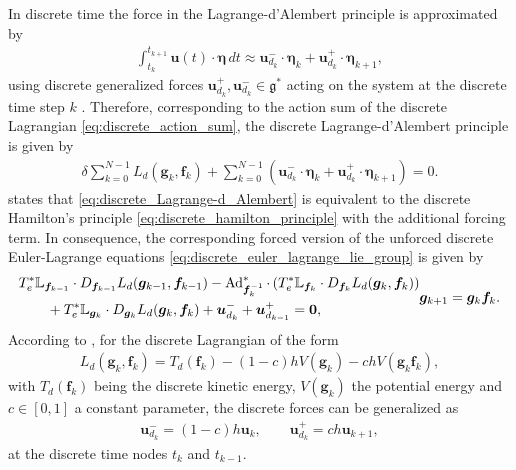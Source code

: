 In discrete time the force in the Lagrange-d'Alembert principle is approximated by 
\begin{align}
    \int_{t_k}^{t_{k+1}} \bm{u}(t) \cdot \bm{\eta}\, dt \approx \bm{u}_{d_k}^- \cdot \bm{\eta}_k + \bm{u}_{d_k}^+ \cdot \bm{\eta}_{k+1},
\end{align}
using discrete generalized forces $\bm{u}_{d_k}^{+}, \bm{u}_{d_k}^{-} \in \mathfrak{g}^*$ acting on the system at the discrete time step $k$ \cite{Lee2008}.
Therefore, corresponding to the action sum of the discrete Lagrangian \eqref{eq:discrete_action_sum}, the discrete Lagrange-d'Alembert principle is given by 
\begin{align}\label{eq:discrete_Lagrange-d_Alembert}
    \delta \sum_{k=0}^{N-1} L_d(\bm{g}_k, \bm{f}_k) + \sum_{k=0}^{N-1} \left( \bm{u}_{d_k}^- \cdot \bm{\eta}_k + \bm{u}_{d_k}^+ \cdot \bm{\eta}_{k+1} \right) = 0.
\end{align}
\cite{Lee2008} states that \eqref{eq:discrete_Lagrange-d_Alembert} is equivalent to the discrete Hamilton's principle \eqref{eq:discrete_hamilton_principle} with the additional forcing term. 
In consequence, 
the corresponding forced version 
of the unforced discrete Euler-Lagrange equations 
\eqref{eq:discrete_euler_lagrange_lie_group} is given by
\begingroup
\small
\begin{subequations}\label{eq:discrete_forced_Euler_Lagrange}
\begin{align}
    \label{eq:discrete_forced_Euler_Lagrange_Dynamics}
    &T^*_{e}\mathbb{L}_{\bm{f}_{k-1}} \cdot D_{\bm{f}_{k-1}} L_d(\bm{g}_{k-1}, \bm{f}_{k-1})
    - \operatorname{Ad}^*_{\bm{f}_{k}^{-1}} \cdot \left(T^*_{e}\mathbb{L}_{\bm{f}_{k}} \cdot D_{\bm{f}_{k}}L_d(\bm{g}_{k}, \bm{f}_{k})\right) \notag \\
    &\qquad + T^*_{e}\mathbb{L}_{\bm{g}_{k}} \cdot D_{\bm{g}_{k}} L_d(\bm{g}_{k}, \bm{f}_{k})
    + \bm{u}^-_{d_k} + \bm{u}^+_{d_{k-1}} = \bm{0},
\end{align}
\vspace{-1.2\baselineskip}
\begin{equation}\label{eq:discrete_forced_Euler_Lagrange_Kinetics}
    \bm{g}_{k+1} = \bm{g}_{k}\bm{f}_{k}.
\end{equation}
\end{subequations}
\endgroup
According to \cite{Lee2008}, for the discrete Lagrangian of the form
\begin{align}\label{eq:discrete_lagrangian_forced_special}
    L_d(\bm{g}_k, \bm{f}_k) = T_d(\bm{f}_k) - (1-c)hV(\bm{g}_k) - chV(\bm{g}_k\bm{f}_k),
\end{align}
with $T_d(\bm{f}_k)$ being the discrete kinetic energy, $V(\bm{g}_k)$ the potential energy and $c \in [0,1]$ a constant parameter, 
the discrete forces can be generalized as
\begin{align}\label{eq:discrete_forces_special}
    \bm{u}_{d_k}^{-} = (1-c)h\bm{u}_k,
    \qquad
    \bm{u}_{d_{k}}^{+} = ch\bm{u}_{k+1},
\end{align}
at the discrete time nodes $t_k$ and $t_{k-1}$. 

